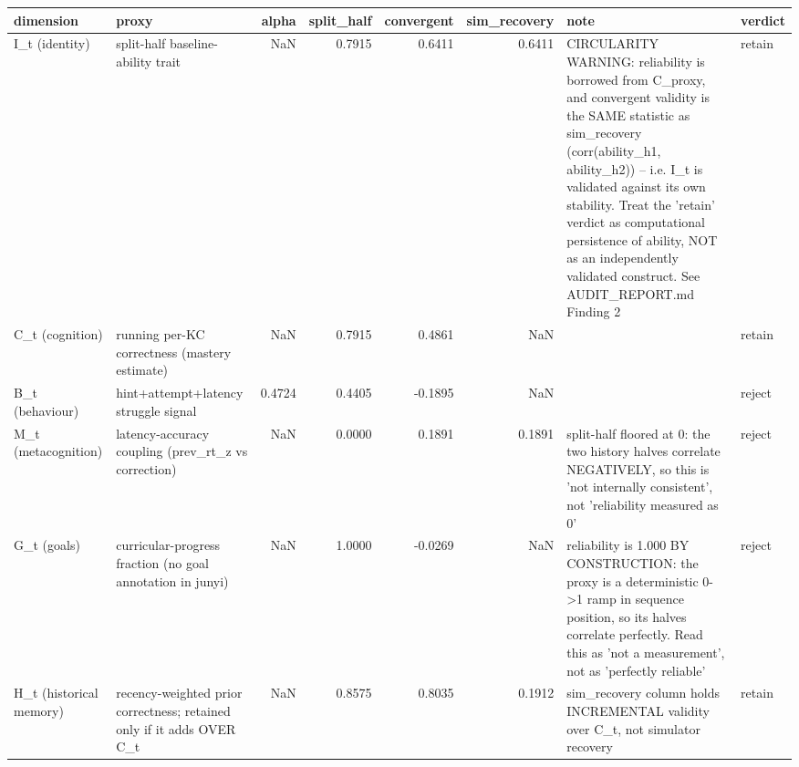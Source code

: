 \begin{tabular}{llrrrrll}
\toprule
dimension & proxy & alpha & split\_half & convergent & sim\_recovery & note & verdict \\
\midrule
I\_t (identity) & split-half baseline-ability trait & NaN & 0.7915 & 0.6411 & 0.6411 & CIRCULARITY WARNING: reliability is borrowed from C\_proxy, and convergent validity is the SAME statistic as sim\_recovery (corr(ability\_h1, ability\_h2)) -- i.e. I\_t is validated against its own stability. Treat the 'retain' verdict as computational persistence of ability, NOT as an independently validated construct. See AUDIT\_REPORT.md Finding 2 & retain \\
C\_t (cognition) & running per-KC correctness (mastery estimate) & NaN & 0.7915 & 0.4861 & NaN &  & retain \\
B\_t (behaviour) & hint+attempt+latency struggle signal & 0.4724 & 0.4405 & -0.1895 & NaN &  & reject \\
M\_t (metacognition) & latency-accuracy coupling (prev\_rt\_z vs correction) & NaN & 0.0000 & 0.1891 & 0.1891 & split-half floored at 0: the two history halves correlate NEGATIVELY, so this is 'not internally consistent', not 'reliability measured as 0' & reject \\
G\_t (goals) & curricular-progress fraction (no goal annotation in junyi) & NaN & 1.0000 & -0.0269 & NaN & reliability is 1.000 BY CONSTRUCTION: the proxy is a deterministic 0->1 ramp in sequence position, so its halves correlate perfectly. Read this as 'not a measurement', not as 'perfectly reliable' & reject \\
H\_t (historical memory) & recency-weighted prior correctness; retained only if it adds OVER C\_t & NaN & 0.8575 & 0.8035 & 0.1912 & sim\_recovery column holds INCREMENTAL validity over C\_t, not simulator recovery & retain \\
\bottomrule
\end{tabular}
